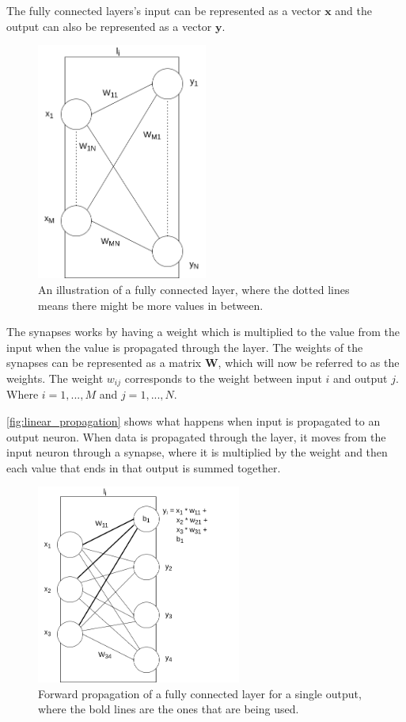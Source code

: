 The fully connected layers's input can be represented as a vector $\bm{x}$ and the output can also be represented as a vector $\bm{y}$.

\begin{figure}
    \centering
    \includegraphics[width=0.5\textwidth]{assets/linear-layer.png}
    \caption{An illustration of a fully connected layer, where the dotted lines means there might be more values in between.}
    \label{fig:neural_network}
\end{figure}


The synapses works by having a weight which is multiplied to the value from the input when the value is propagated through the layer.
The weights of the synapses can be represented as a matrix $\bm{W}$, which will now be referred to as the weights.
The weight $w_{ij}$ corresponds to the weight between input $i$ and output $j$.
Where $i = 1, ..., M$ and $j = 1, ..., N$.

\autoref{fig:linear_propagation} shows what happens when input is propagated to an output neuron. When data is propagated through the layer, it moves from the input neuron through a synapse, where it is multiplied by the weight and then each value that ends in that output is summed together.

\begin{figure}
    \centering
    \includegraphics[width=0.6\textwidth]{assets/linear-layer-linear-propagation.drawio.png}
    \caption{Forward propagation of a fully connected layer for a single output, where the bold lines are the ones that are being used.}
    \label{fig:linear_propagation}
\end{figure}

